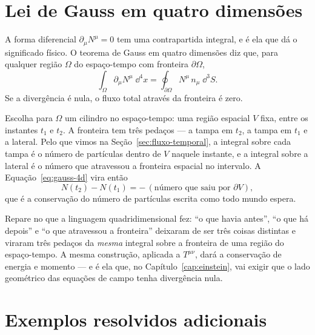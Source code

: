 \documentclass[12pt,a4paper,oneside]{book}
\theoremstyle{rgplain}
\theoremstyle{rgremark}
\begin{document}
\section{Lei de Gauss em quatro dimensões}
\label{sec:gauss-4d}

A forma diferencial $\partial_\mu N^\mu=0$ tem uma contrapartida integral, e
é ela que dá o significado físico. O teorema de Gauss em quatro dimensões diz
que, para qualquer região $\Omega$ do espaço-tempo com fronteira
$\partial\Omega$,
\begin{equation}
  \int_\Omega \partial_\mu N^\mu\;\dd^4x
  =\oint_{\partial\Omega} N^\mu\,n_\mu\;\dd^3S .
  \label{eq:gauss-4d}
\end{equation}
Se a divergência é nula, o fluxo total através da fronteira é zero.

Escolha para $\Omega$ um cilindro no espaço-tempo: uma região espacial $V$
fixa, entre os instantes $t_1$ e $t_2$. A fronteira tem três pedaços --- a
tampa em $t_2$, a tampa em $t_1$ e a lateral. Pelo que vimos na
Seção~\ref{sec:fluxo-temporal}, a integral sobre cada tampa é o número de
partículas dentro de $V$ naquele instante, e a integral sobre a lateral é o
número que atravessou a fronteira espacial no intervalo. A
Equação~\eqref{eq:gauss-4d} vira então
\[
  N(t_2)-N(t_1)=-\,(\text{número que saiu por } \partial V) ,
\]
que é a conservação do número de partículas escrita como todo mundo espera.

\begin{central}
Repare no que a linguagem quadridimensional fez: ``o que havia antes'', ``o
que há depois'' e ``o que atravessou a fronteira'' deixaram de ser três
coisas distintas e viraram três pedaços da \emph{mesma} integral sobre a
fronteira de uma região do espaço-tempo. A mesma construção, aplicada a
$T^{\mu\nu}$, dará a conservação de energia e momento --- e é ela que, no
Capítulo~\ref{cap:einstein}, vai exigir que o lado geométrico das equações de
campo tenha divergência nula.
\end{central}

\section{Exemplos resolvidos adicionais}
\end{document}
